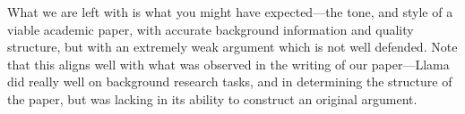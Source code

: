 What we are left with is what you might have expected—the tone, and style of a
viable academic paper, with accurate background information and quality
structure, but with an extremely weak argument which is not well defended. Note 
that this aligns well with what was observed in the writing of our paper—Llama
did really well on background research tasks, and in determining the structure
of the paper, but was lacking in its ability to construct an original argument.
